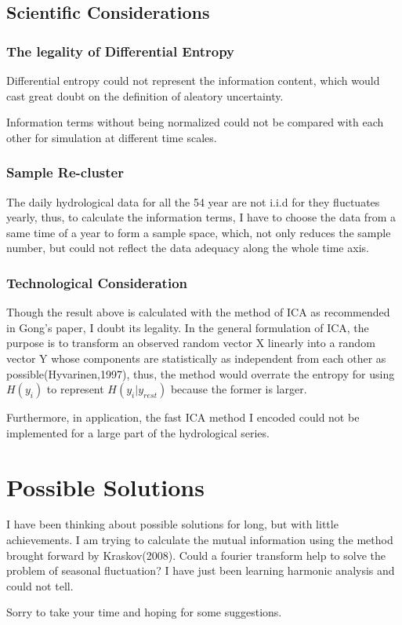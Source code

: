 \documentclass[11pt]{article}
\begin{document}
\subsection*{Scientific Considerations}
\subsubsection*{The legality of Differential Entropy}

Differential entropy could not represent the information content, which would cast great doubt on the definition of aleatory uncertainty.

Information terms without being normalized could not be compared with each other for simulation at different time scales.
\subsubsection*{Sample Re-cluster}
The daily hydrological data for all the 54 year are not i.i.d for they fluctuates yearly, thus, to calculate the information terms, I have to choose the data from a same time of a year to form a sample space, which, not  only reduces the sample number, but could not reflect the data adequacy along the whole time axis.
\subsubsection*{Technological Consideration}

Though the result above is calculated with the method of ICA as recommended in Gong's paper,
I doubt its legality. In the general formulation of ICA, the purpose is to transform an observed random vector X linearly into a random vector Y whose components are statistically as independent from each other as possible(Hyvarinen,1997), thus, the  method would overrate the entropy for using $H(y_i)$ to represent $H(y_i|y_{rest})$ because the former is larger.
 
Furthermore, in application, the fast ICA method I encoded could not be implemented for a large part of the hydrological series.

\section*{Possible Solutions}
I have been thinking about possible solutions for long, but with little achievements.
I am trying to calculate the mutual information using the method brought forward by Kraskov(2008). Could a fourier transform help to solve the problem of seasonal fluctuation? I have just been learning harmonic analysis and could not tell. 

Sorry to take your time and hoping for some suggestions.
\end{document}
